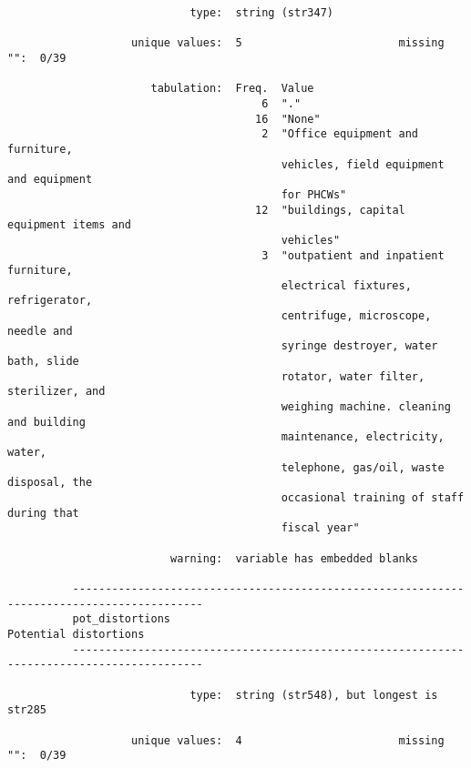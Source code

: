 \documentclass{article}
\begin{document}
\begin{verbatim}
                            type:  string (str347)
          
                   unique values:  5                        missing "":  0/39
          
                      tabulation:  Freq.  Value
                                       6  "."
                                      16  "None"
                                       2  "Office equipment and furniture,
                                          vehicles, field equipment and equipment
                                          for PHCWs"
                                      12  "buildings, capital equipment items and
                                          vehicles"
                                       3  "outpatient and inpatient furniture,
                                          electrical fixtures, refrigerator,
                                          centrifuge, microscope, needle and
                                          syringe destroyer, water bath, slide
                                          rotator, water filter, sterilizer, and
                                          weighing machine. cleaning and building
                                          maintenance, electricity, water,
                                          telephone, gas/oil, waste disposal, the
                                          occasional training of staff during that
                                          fiscal year"
          
                         warning:  variable has embedded blanks
          
          ------------------------------------------------------------------------------------------
          pot_distortions                                                      Potential distortions
          ------------------------------------------------------------------------------------------
          
                            type:  string (str548), but longest is str285
          
                   unique values:  4                        missing "":  0/39
          

\end{verbatim}
\end{document}
